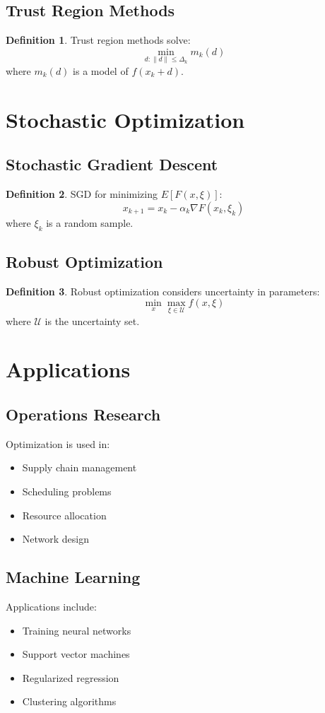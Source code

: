 \documentclass[11pt]{article}
\theoremstyle{definition}
\newtheorem{definition}{Definition}[section]
\begin{document}
\subsection{Trust Region Methods}
\begin{definition}
Trust region methods solve:
$$\min_{d: \|d\| \leq \Delta_k} m_k(d)$$
where $m_k(d)$ is a model of $f(x_k + d)$.
\end{definition}

\section{Stochastic Optimization}

\subsection{Stochastic Gradient Descent}
\begin{definition}
SGD for minimizing $E[F(x, \xi)]$:
$$x_{k+1} = x_k - \alpha_k \nabla F(x_k, \xi_k)$$
where $\xi_k$ is a random sample.
\end{definition}

\subsection{Robust Optimization}
\begin{definition}
Robust optimization considers uncertainty in parameters:
$$\min_{x} \max_{\xi \in \mathcal{U}} f(x, \xi)$$
where $\mathcal{U}$ is the uncertainty set.
\end{definition}

\section{Applications}

\subsection{Operations Research}
Optimization is used in:
\begin{itemize}
    \item Supply chain management
    \item Scheduling problems
    \item Resource allocation
    \item Network design
\end{itemize}

\subsection{Machine Learning}
Applications include:
\begin{itemize}
    \item Training neural networks
    \item Support vector machines
    \item Regularized regression
    \item Clustering algorithms
\end{itemize}
\end{document}
